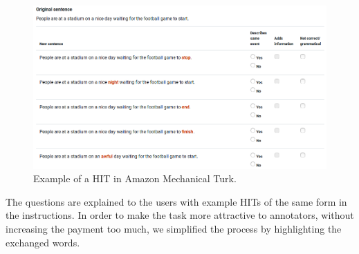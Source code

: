 \begin{figure}[tph!]
\centering
	\includegraphics[totalheight=7cm]{fig/sample_hit.png}
	\caption{Example of a \ac{HIT} in Amazon Mechanical Turk.}
	\label{fig:example_hit}
\end{figure}
The questions are explained to the users with example \ac{HIT}s of the same form in the instructions. In order to make the task more attractive to annotators, without increasing the payment too much, we simplified the process by highlighting the exchanged words.
\newline

